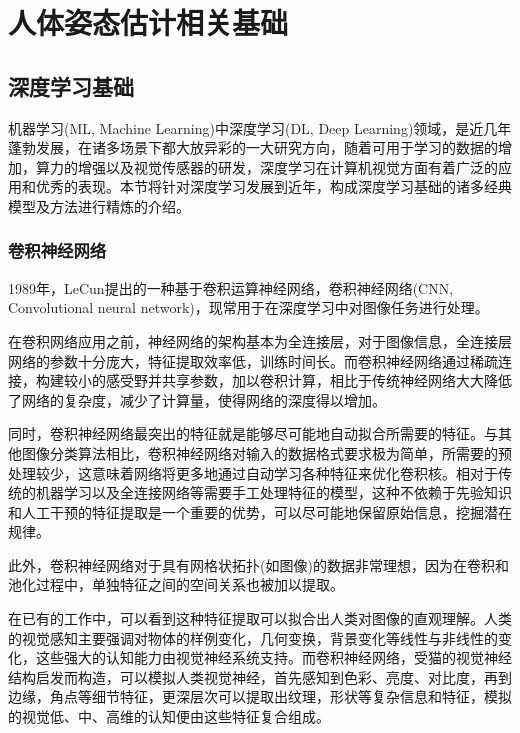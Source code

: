 
\chapter{人体姿态估计相关基础}


\section{深度学习基础}


机器学习(ML, Machine Learning)中深度学习(DL, Deep Learning)领域，是近几年蓬勃发展，在诸多场景下都大放异彩的一大研究方向，随着可用于学习的数据的增加，算力的增强以及视觉传感器的研发，深度学习在计算机视觉方面有着广泛的应用和优秀的表现。本节将针对深度学习发展到近年，构成深度学习基础的诸多经典模型及方法进行精炼的介绍。



\subsection{卷积神经网络}{}

1989年，LeCun提出的一种基于卷积运算神经网络，卷积神经网络(CNN, Convolutional neural network)，现常用于在深度学习中对图像任务进行处理。

在卷积网络应用之前，神经网络的架构基本为全连接层，对于图像信息，全连接层网络的参数十分庞大，特征提取效率低，训练时间长。而卷积神经网络通过稀疏连接，构建较小的感受野并共享参数，加以卷积计算，相比于传统神经网络大大降低了网络的复杂度，减少了计算量，使得网络的深度得以增加。

同时，卷积神经网络最突出的特征就是能够尽可能地自动拟合所需要的特征。与其他图像分类算法相比，卷积神经网络对输入的数据格式要求极为简单，所需要的预处理较少，这意味着网络将更多地通过自动学习各种特征来优化卷积核。相对于传统的机器学习以及全连接网络等需要手工处理特征的模型，这种不依赖于先验知识和人工干预的特征提取是一个重要的优势，可以尽可能地保留原始信息，挖掘潜在规律。

此外，卷积神经网络对于具有网格状拓扑(如图像)的数据非常理想，因为在卷积和池化过程中，单独特征之间的空间关系也被加以提取。

在已有的工作中，可以看到这种特征提取可以拟合出人类对图像的直观理解。人类的视觉感知主要强调对物体的样例变化，几何变换，背景变化等线性与非线性的变化，这些强大的认知能力由视觉神经系统支持。而卷积神经网络，受猫的视觉神经结构启发而构造，可以模拟人类视觉神经，首先感知到色彩、亮度、对比度，再到边缘，角点等细节特征，更深层次可以提取出纹理，形状等复杂信息和特征，模拟的视觉低、中、高维的认知便由这些特征复合组成。

